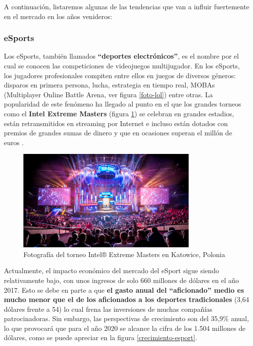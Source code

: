 A continuación, listaremos algunas de las tendencias que van a influir fuertemente en el mercado en los años venideros:

\subsubsection{eSports}
Los eSports, también llamados \textbf{``deportes electrónicos''}, es el nombre por el cual se conocen las competiciones de videojuegos multijugador. En los eSports, los jugadores profesionales compiten entre ellos en juegos de diversos géneros: disparos en primera persona, lucha, estrategia en tiempo real, MOBAs (Multiplayer Online Battle Arena, ver figura \ref{foto-lol}) entre otras. La popularidad de este fenómeno ha llegado al punto en el que los grandes torneos como el \textbf{Intel Extreme Masters} (figura \ref{foto-torneo-esport}) se celebran en grandes estadios, están retransmitidos en streaming por Internet e incluso están dotados con premios de grandes sumas de dinero y que en ocasiones superan el millón de euros \cite{libro_blanco}.

\begin{figure}[h]
    \centering
    \includegraphics[width=0.8\textwidth]{images/estadodelarte/mercado/foto-torneo-esport}
    \caption{Fotografía del torneo Intel® Extreme Masters en Katowice, Polonia}
    \label{foto-torneo-esport}
\end{figure}

Actualmente, el impacto económico del mercado del eSport sigue siendo relativamente bajo, con unos ingresos de solo 660 millones de dólares en el año 2017. Esto se debe en parte a que \textbf{el gasto anual del ``aficionado'' medio es mucho menor que el de los aficionados a los deportes tradicionales} (3,64 dólares frente a 54) lo cual frena las inversiones de muchas compañías patrocinadoras. Sin embargo, las perspectivas de crecimiento son del 35,9\% anual, lo que provocará que para el año 2020 se alcance la cifra de los 1.504 millones de dólares, como se puede apreciar en la figura \ref{crecimiento-esport}.

